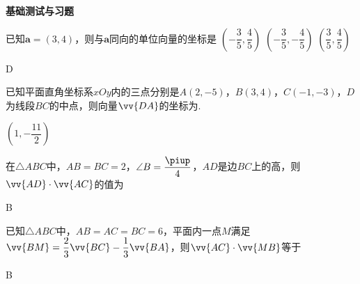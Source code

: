 \begin{exercise}{\textbf{基础测试与习题}}
    \item%
      已知$\bm a=(3,4)$，则与$\bm a$同向的单位向量的坐标是\xz
       {$(-\dfrac{3}5,\dfrac{4}5)$}
       {$(-\dfrac{3}5,-\dfrac{4}5)$}
       {$(\dfrac{3}5,\dfrac{4}5)$}
      \begin{answer}
        D
      \end{answer}
    \item%
      已知平面直角坐标系$xOy$内的三点分别是$A(2,-5)$，$B(3,4)$，$C(-1,-3)$，$D$为线段$BC$的中点，则向量$\vv{DA}$的坐标为\tk.
      \begin{answer}
        $(1,-\dfrac{11}2)$
      \end{answer}
    \item%
      在$\triangle{ABC}$中，$AB=BC=2$，$\angle{B}=\dfrac{\piup}4$，$AD$是边$BC$上的高，则$\vv{AD}\cdot\vv{AC}$的值为\xz
      \begin{answer}
        B
      \end{answer}
    \item%
      已知$\triangle{ABC}$中，$AB=AC=BC=6$，平面内一点$M$满足$\vv{BM}=\dfrac{2}3\vv{BC}-\dfrac{1}3\vv{BA}$，则$\vv{AC}\cdot\vv{MB}$等于\xz
      \begin{answer}
        B
      \end{answer}
  \end{exercise}
